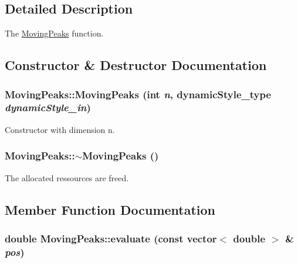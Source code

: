 \subsection{Detailed Description}
The \hyperlink{classMovingPeaks}{MovingPeaks} function. 

\subsection{Constructor \& Destructor Documentation}
\hypertarget{classMovingPeaks_d5de60c6396d5280e04530e29b9199c5}{
\subsubsection{\setlength{\rightskip}{0pt plus 5cm}MovingPeaks::MovingPeaks (int {\em n}, \/  {\bf dynamicStyle\_\-type} {\em dynamicStyle\_\-in})}}
\label{classMovingPeaks_d5de60c6396d5280e04530e29b9199c5}


Constructor with dimension n. 

\hypertarget{classMovingPeaks_672ff5eb4561c402f64d5c8c73f2cc84}{
\subsubsection{\setlength{\rightskip}{0pt plus 5cm}MovingPeaks::$\sim$MovingPeaks ()}}
\label{classMovingPeaks_672ff5eb4561c402f64d5c8c73f2cc84}


The allocated ressources are freed. 



\subsection{Member Function Documentation}
\hypertarget{classMovingPeaks_6f7165d8ab1b805ff2e3b6cb3df8b7f3}{
\subsubsection{\setlength{\rightskip}{0pt plus 5cm}double MovingPeaks::evaluate (const vector$<$ double $>$ \& {\em pos})}}
\label{classMovingPeaks_6f7165d8ab1b805ff2e3b6cb3df8b7f3}


